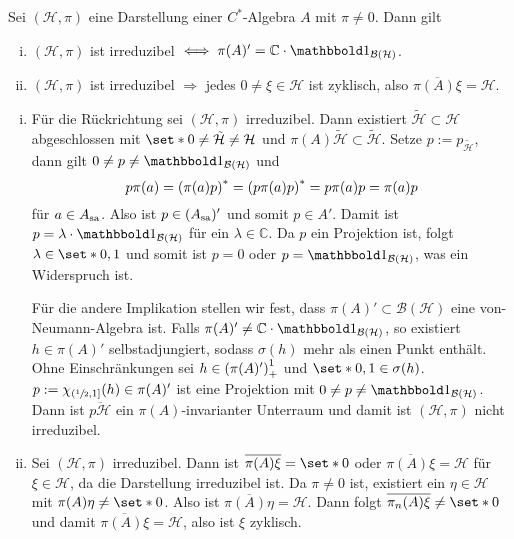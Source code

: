 \begin{satz}[{name=[Eigenschaften irreduzibler Darstellungen]},label=satz:73]
	Sei $(\mathcal{H},\pi)$ eine Darstellung einer $C^*$-Algebra $A$ mit $\pi \neq 0$. Dann gilt
	\begin{enumerate}[(i)]
		\item $(\mathcal{H},\pi)$ ist irreduzibel $\iff \pi(A)'= \mathbb{C} \cdot \ind_{\mathcal{B}(\mathcal{H})}$.
		\item $(\mathcal{H},\pi)$ ist irreduzibel $\Longrightarrow$ jedes $0 \neq \xi \in \mathcal{H}$ ist zyklisch, also $\overline{\pi(A)\xi}=\mathcal{H}$.
	\end{enumerate}
\end{satz}
\begin{beweis}
	\leavevmode
	\begin{enumerate}[(i)]
		\item Für die Rückrichtung sei $(\mathcal{H},\pi)$ irreduzibel. 
		Dann existiert $\tilde{\mathcal{H}} \subset \mathcal{H}$ abgeschlossen mit $\set*{0} \neq \tilde{\mathcal{H}}\neq \mathcal{H}$ und $\pi(A)\tilde{\mathcal{H}} \subset \tilde{\mathcal{H}}$.
		Setze $p := p_{\tilde{\mathcal{H}}}$, dann gilt $0 \neq p \neq \ind_{\mathcal{B}(\mathcal{H})}$ und 
		\[
			p \pi(a)=\enbrace*{\pi(a)p}^* =\enbrace*{p \pi(a)p}^*=p \pi(a) p=\pi(a)p 
		\]
		für $a \in A_\sa$. 
		Also ist $p	\in (A_\sa)'$ und somit $p \in A'$.
		Damit ist $p= \lambda \cdot \ind_{\mathcal{B}(\mathcal{H})}$ für ein $\lambda \in \mathbb{C}$.
		Da $p$ ein Projektion ist, folgt $\lambda \in \set*{0,1}$ und somit ist $p=0$ oder $p=\ind_{\mathcal{B}(\mathcal{H})}$, was ein Widerspruch ist.
		
		Für die andere Implikation stellen wir fest, dass $\pi(A)' \subset \mathcal{B}(\mathcal{H})$ eine von-Neumann-Algebra ist.
		Falls $\pi(A)' \neq \mathbb{C} \cdot \ind_{\mathcal{B}(\mathcal{H})}$, so existiert $h \in \pi(A)'$ selbstadjungiert, sodass $\sigma(h)$ mehr als einen Punkt enthält.
		Ohne Einschränkungen sei $h \in \enbrace*{\pi(A)'}^1_+$ und $\set*{0,1} \in \sigma(h)$.
		$p :=\chi_{(\sfrac{1}{2},1]}(h) \in \pi(A)'$ ist eine Projektion mit $0\neq p \neq \ind_{\mathcal{B}(\mathcal{H})}$.
		Dann ist $\overline{p \mathcal{H}}$ ein $\pi(A)$-invarianter Unterraum und damit ist $(\mathcal{H},\pi)$ nicht irreduzibel.
		\item Sei $(\mathcal{H},\pi)$ irreduzibel.
		Dann ist $\overline{\pi(A)\xi}=\set*{0}$ oder $\overline{\pi(A)\xi}=\mathcal{H}$ für $\xi \in \mathcal{H}$, da die Darstellung irreduzibel ist.
		Da $\pi\neq 0$ ist, existiert ein $\eta \in \mathcal{H}$ mit $\pi(A)\eta \neq \set*{0}$.
		Also ist $\overline{\pi(A)\eta}=\mathcal{H}$.
		Dann folgt $\overline{\pi_n(A)\xi} \neq \set*{0}$ und damit $\overline{\pi(A)\xi}=\mathcal{H}$, also ist $\xi$ zyklisch.\qedhere
	\end{enumerate}
\end{beweis}

